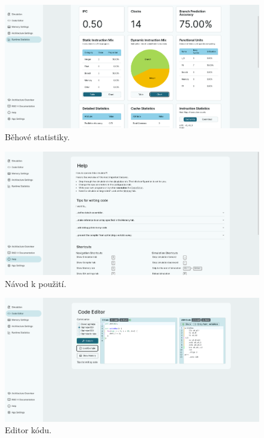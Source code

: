 \begin{figure}
    \includegraphics[width=\textwidth]{obrazky-figures/gallery/Selection_104.png}
    \caption{Běhové statistiky.}
    \label{gallery:stats}
\end{figure}

\begin{figure}
    \includegraphics[width=\textwidth]{obrazky-figures/gallery/Selection_105.png}
    \caption{Návod k použití.}
    \label{gallery:help}
\end{figure}

\begin{figure}
    \includegraphics[width=\textwidth]{obrazky-figures/gallery/Selection_106.png}
    \caption{Editor kódu.}
    \label{gallery:compiler}
\end{figure}